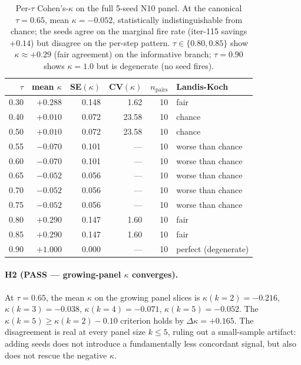 \begin{table}[t]
\centering
\caption{Per-$\tau$ Cohen's-$\kappa$ on the full 5-seed N10 panel.  At
the canonical $\tau=0.65$, mean $\kappa = -0.052$, statistically
indistinguishable from chance; the seeds agree on the marginal fire
rate (iter-115 savings $+0.14$) but disagree on the per-step pattern.
$\tau \in \{0.80, 0.85\}$ show $\kappa \approx +0.29$ (fair agreement)
on the informative branch; $\tau=0.90$ shows $\kappa=1.0$ but is
degenerate (no seed fires).}
\label{tab:p7-iter143-h1}
\small
\begin{tabular}{rrrrrl}
\hline
$\tau$ & mean $\kappa$ & SE$(\kappa)$ & CV$(\kappa)$ & $n_\mathrm{pairs}$ & Landis-Koch \\
\hline
0.30 & $+0.288$ & 0.148 & 1.62 & 10 & fair \\
0.40 & $+0.010$ & 0.072 & 23.58 & 10 & chance \\
0.50 & $+0.010$ & 0.072 & 23.58 & 10 & chance \\
0.55 & $-0.070$ & 0.101 & --- & 10 & worse than chance \\
0.60 & $-0.070$ & 0.101 & --- & 10 & worse than chance \\
0.65 & $-0.052$ & 0.056 & --- & 10 & worse than chance \\
0.70 & $-0.052$ & 0.056 & --- & 10 & worse than chance \\
0.75 & $-0.052$ & 0.056 & --- & 10 & worse than chance \\
0.80 & $+0.290$ & 0.147 & 1.60 & 10 & fair \\
0.85 & $+0.290$ & 0.147 & 1.60 & 10 & fair \\
0.90 & $+1.000$ & 0.000 & --- & 10 & perfect (degenerate) \\
\hline
\end{tabular}
\end{table}

\paragraph{H2 (PASS --- growing-panel $\kappa$ converges).}
At $\tau=0.65$, the mean $\kappa$ on the growing panel slices is
$\kappa(k{=}2)=-0.216$, $\kappa(k{=}3)=-0.038$, $\kappa(k{=}4)=-0.071$,
$\kappa(k{=}5)=-0.052$. The $\kappa(k{=}5) \geq \kappa(k{=}2) - 0.10$
criterion holds by $\Delta\kappa = +0.165$. The disagreement is real at
every panel size $k \leq 5$, ruling out a small-sample artifact: adding
seeds does not introduce a fundamentally less concordant signal, but
also does not rescue the negative $\kappa$.

